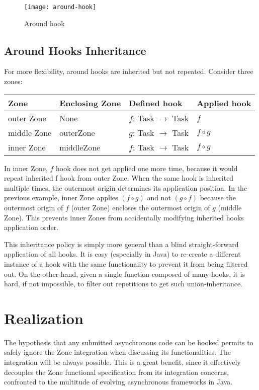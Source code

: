 \begin{figure}[h]
  \centering
  \texttt{[image: around-hook]}
  \caption{Around hook}
  \label{fig:around-hook}
\end{figure}

\subsection*{Around Hooks Inheritance}

For more flexibility, around hooks are inherited but not repeated. Consider three zones:

\begin{tabular}{|l|l|l|l|}
\hline
\textbf{Zone} & \textbf{Enclosing Zone} & \textbf{Defined hook} & \textbf{Applied hook}
\\\hline
outer Zone & None & $f$: Task $\rightarrow$ Task & $f$
\\\hline
middle Zone & outerZone & $g$: Task $\rightarrow$ Task & $f \circ g$
\\\hline
inner Zone & middleZone & $f$: Task $\rightarrow$ Task & $f \circ g$
\\\hline
\end{tabular}

In inner Zone, $f$ hook does not get applied one more time, because it would repeat inherited f hook from outer Zone. When the same hook is inherited multiple times, the outermost origin determines its application position. In the previous example, inner Zone applies $( f \circ g )$ and not $( g \circ f )$ because the outermost origin of $f$ (outer Zone) encloses the outermost origin of $g$ (middle Zone). This prevents inner Zones from accidentally modifying inherited hooks application order.

This inheritance policy is simply more general than a blind straight-forward application of all hooks. It is easy (especially in Java) to re-create a different instance of a hook with the same functionality to prevent it from being filtered out. On the other hand, given a single function composed of many hooks, it is hard, if not impossible, to filter out repetitions to get such union-inheritance.

\section{Realization}
\label{sec:realization}

The hypothesis that any submitted asynchronous code can be hooked permits to safely ignore the Zone integration when discussing its functionalities. The integration will be always possible. This is a great benefit, since it effectively decouples the Zone functional specification from its integration concerns, confronted to the multitude of evolving asynchronous frameworks in Java.

